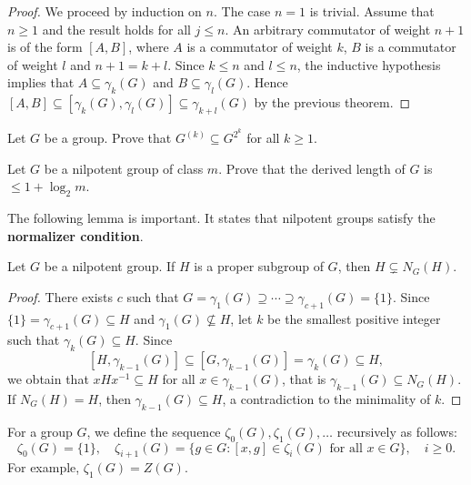 \begin{proof}
We proceed by induction on $n$. The case $n=1$ is trivial. Assume that $n\geq1$ and 
the result holds for all $j\leq n$. An arbitrary commutator of weight $n+1$ 
is of the form $[A,B]$, where $A$ is a commutator of weight $k$,
$B$ is a commutator of weight $l$ and $n+1=k+l$. Since $k\leq n$ and $l\leq n$, 
the inductive hypothesis implies that  $A\subseteq \gamma_k(G)$ and $B\subseteq
\gamma_l(G)$. Hence $[A,B]\subseteq [\gamma_k(G),\gamma_l(G)]\subseteq
\gamma_{k+l}(G)$ by the previous theorem.
\end{proof}

\begin{exercise}
\label{xca:inclusion}
    Let $G$ be a group. Prove that $G^{(k)}\subseteq G^{2^k}$ for all $k\geq1$. 
\end{exercise}

\begin{exercise}
\label{xca:derived_length}
    Let $G$ be a nilpotent group of class $m$. Prove that
    the derived length of $G$ is $\leq 1+\log_2m$.
\end{exercise}

The following lemma is important. It states that nilpotent groups satisfy 
the \textbf{normalizer condition}. 

\begin{lemma}
\label{lem:normalizadora}
Let $G$ be a nilpotent group. If $H$ is a proper subgroup of $G$, then 
$H\subsetneq N_G(H)$.
\end{lemma}

\begin{proof}
There exists $c$ such that $G=\gamma_1(G)\supseteq\cdots\supseteq\gamma_{c+1}(G)=\{1\}$. Since 
$\{1\}=\gamma_{c+1}(G)\subseteq H$ and $\gamma_1(G)\not\subseteq H$, 
let $k$ be the smallest positive integer such that  $\gamma_k(G)\subseteq H$. 
Since
\[
[H,\gamma_{k-1}(G)]\subseteq [G,\gamma_{k-1}(G)]=\gamma_k(G)\subseteq H,
\]
we obtain that  
$xHx^{-1}\subseteq H$ for all $x\in\gamma_{k-1}(G)$,
that is $\gamma_{k-1}(G)\subseteq N_G(H)$. If $N_G(H)=H$, then
$\gamma_{k-1}(G)\subseteq H$, a contradiction to the minimality of $k$. 
\end{proof}

For a group $G$, we define the sequence  $\zeta_0(G),\zeta_1(G),\dots$
recursively as follows: 
\[
	\zeta_0(G)=\{1\},\quad
	\zeta_{i+1}(G)=\{g\in G:[x,g]\in\zeta_{i}(G)\text{ for all $x\in G$}\},\quad i\geq 0.
\]
For example, $\zeta_1(G)=Z(G)$.

